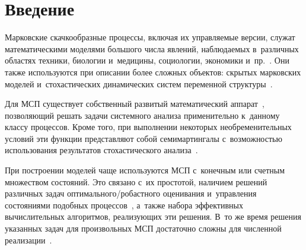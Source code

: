 
  
\vspace*{-6pt}



\thispagestyle{headings}

\begin{multicols}{2}

\label{st\stat}


\section{Введение}

\vspace*{-8pt}

Марковские скачкообразные процессы, вклю\-чая их управ\-ля\-емые версии, служат 
математическими моделями большого числа явлений, наблюдаемых в~различных областях 
техники, биологии и~медицины, социологии, экономики и~пр.~\cite{W_93}. Они так\-же 
используются при описании более сложных объектов: скрытых марковских моделей 
и~стохастических динамических сис\-тем переменной структуры~\cite{EM_02, DLW_23}.

Для МСП существует собственный развитый математический аппарат~\cite{D_63, GS_73_2}, позволяющий решать задачи системного анализа применительно к~данному 
классу процессов. Кроме того, при выполнении некоторых необременительных условий 
эти функции представляют собой семимартингалы с~возможностью использования 
результатов стохастического анализа~\cite{LSh_86}.

При построении моделей чаще используются МСП с~конечным или счетным множеством 
состояний. Это связано с~их простотой, наличием решений различных задач 
оп\-ти\-маль\-но\-го/ро\-баст\-но\-го оценивания и~управления состояниями подобных процессов~\cite{EAM_10}, а~также набора эффективных вычислительных алгоритмов, реализующих 
эти решения. В~то же время решения указанных задач для произвольных МСП 
достаточно сложны для численной реализации~\cite{LSh_86, WD_79, CGT_02}.


\end{multicols}
